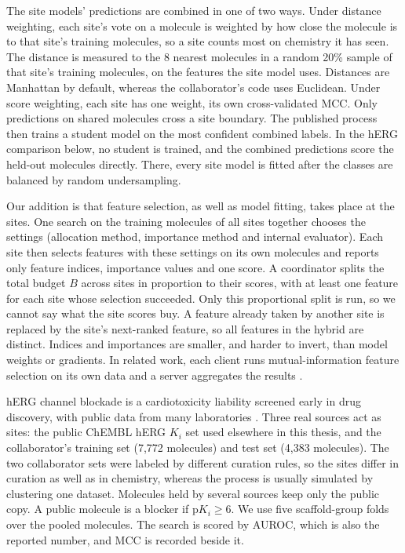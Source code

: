 The site models' predictions are combined in one of two ways. Under distance weighting, each site's vote on a molecule is weighted by how close the molecule is to that site's training molecules, so a site counts most on chemistry it has seen. The distance is measured to the 8 nearest molecules in a random 20\% sample of that site's training molecules, on the features the site model uses. Distances are Manhattan by default, whereas the collaborator's code uses Euclidean. Under score weighting, each site has one weight, its own cross-validated MCC. Only predictions on shared molecules cross a site boundary. The published process then trains a student model on the most confident combined labels. In the hERG comparison below, no student is trained, and the combined predictions score the held-out molecules directly. There, every site model is fitted after the classes are balanced by random undersampling.

Our addition is that feature selection, as well as model fitting, takes place at the sites. One search on the training molecules of all sites together chooses the settings (allocation method, importance method and internal evaluator). Each site then selects features with these settings on its own molecules and reports only feature indices, importance values and one score. A coordinator splits the total budget $B$ across sites in proportion to their scores, with at least one feature for each site whose selection succeeded. Only this proportional split is run, so we cannot say what the site scores buy. A feature already taken by another site is replaced by the site's next-ranked feature, so all features in the hybrid are distinct. Indices and importances are smaller, and harder to invert, than model weights or gradients. In related work, each client runs mutual-information feature selection on its own data and a server aggregates the results \citep{Cassara2022}.

hERG channel blockade is a cardiotoxicity liability screened early in drug discovery, with public data from many laboratories \citep{Czodrowski2013}. Three real sources act as sites: the public ChEMBL hERG $K_i$ set used elsewhere in this thesis, and the collaborator's training set (7,772 molecules) and test set (4,383 molecules). The two collaborator sets were labeled by different curation rules, so the sites differ in curation as well as in chemistry, whereas the process is usually simulated by clustering one dataset. Molecules held by several sources keep only the public copy. A public molecule is a blocker if $\mathrm{p}K_i \ge 6$. We use five scaffold-group folds over the pooled molecules. The search is scored by AUROC, which is also the reported number, and MCC is recorded beside it.

